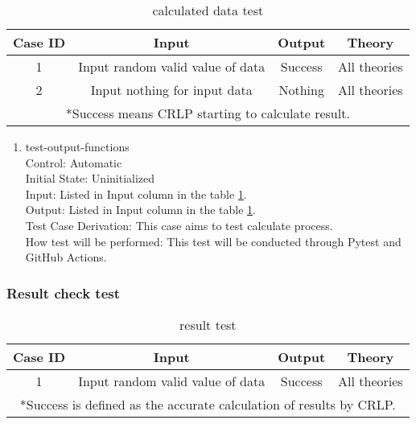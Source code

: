 \documentclass[12pt, titlepage]{article}
\begin{document}
\begin{table}
    \centering
    \begin{adjustbox}{width=\textwidth}
    \begin{tabularx}{\textwidth}{c|c|c|c} %
    \hline
        Case ID & Input & Output & Theory\\
    \hline
        1 & Input random valid value of data & Success & All theories\\
    \hline
        2& Input nothing for input data & Nothing & All theories\\
    \hline
    \multicolumn{4}{p{\dimexpr\textwidth-2\tabcolsep\relax}}{*Success means CRLP starting to calculate result.} \\ 
    \end{tabularx}
    \end{adjustbox}
    \caption{calculated data test}
    \label{tab:caltest}
\end{table}

\begin{enumerate}

    \item test-output-functions \\
    Control: Automatic	\\				
    Initial State: Uninitialized\\		
    Input: Listed in Input column in the table \ref{tab:caltest}.\\			
    Output: Listed in Input column in the table \ref{tab:caltest}.\\
    Test Case Derivation: This case aims to test calculate process.\\
    How test will be performed: This test will be conducted through Pytest and GitHub Actions.\\
					
\end{enumerate}

\subsubsection{Result check test}

\begin{table}
    \centering
    \begin{adjustbox}{width=\textwidth}
    \begin{tabularx}{\textwidth}{c|c|c|c} %
    \hline
        Case ID & Input & Output & Theory\\
    \hline
        1 & Input random valid value of data & Success & All theories\\
    \hline
    \multicolumn{4}{p{\dimexpr\textwidth-2\tabcolsep\relax}}{*Success is defined as the accurate calculation of results by CRLP.} \\ 
    \end{tabularx}
    \end{adjustbox}
    \caption{result test}
    \label{tab:resulttest}
\end{table}
\end{document}
